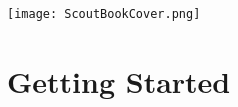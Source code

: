 \documentclass[a4paper,10pt,twoside]{book}
\begin{document}
\ifpdf
  
\else
  \texttt{[image: ScoutBookCover.png]}
\fi

\thispagestyle{empty}
\frontmatter




\pagestyle{plain}

\tableofcontents
\sloppy


\mainmatter


\pagestyle{headings}

\part{Getting Started}

% 



% 

% 

% 
% 
% 
% 
% 
\end{document}
